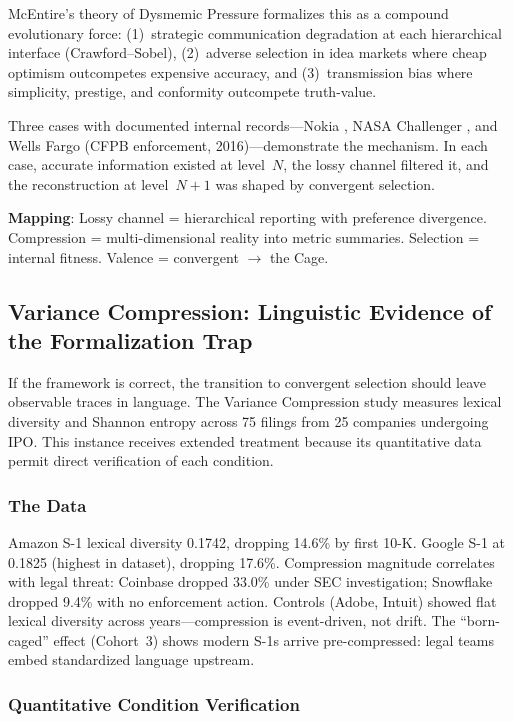 \documentclass[12pt,letterpaper]{article}
\theoremstyle{definition}
\theoremstyle{remark}
\begin{document}
McEntire's theory of Dysmemic Pressure formalizes this as a compound evolutionary force: (1)~strategic communication degradation at each hierarchical interface (Crawford--Sobel), (2)~adverse selection in idea markets where cheap optimism outcompetes expensive accuracy, and (3)~transmission bias where simplicity, prestige, and conformity outcompete truth-value.

Three cases with documented internal records---Nokia \citep{vuori2016}, NASA Challenger \citep{vaughan1996}, and Wells Fargo (CFPB enforcement, 2016)---demonstrate the mechanism. In each case, accurate information existed at level~$N$, the lossy channel filtered it, and the reconstruction at level~$N{+}1$ was shaped by convergent selection.

\textbf{Mapping}: Lossy channel = hierarchical reporting with preference divergence. Compression = multi-dimensional reality into metric summaries. Selection = internal fitness. Valence = convergent $\to$ the Cage.


\subsection{Variance Compression: Linguistic Evidence of the Formalization Trap}

If the framework is correct, the transition to convergent selection should leave observable traces in language. The Variance Compression study measures lexical diversity and Shannon entropy across 75 filings from 25 companies undergoing IPO\@. This instance receives extended treatment because its quantitative data permit direct verification of each condition.

\subsubsection{The Data}

Amazon S-1 lexical diversity 0.1742, dropping 14.6\% by first 10-K\@. Google S-1 at 0.1825 (highest in dataset), dropping 17.6\%. Compression magnitude correlates with legal threat: Coinbase dropped 33.0\% under SEC investigation; Snowflake dropped 9.4\% with no enforcement action. Controls (Adobe, Intuit) showed flat lexical diversity across years---compression is event-driven, not drift. The ``born-caged'' effect (Cohort~3) shows modern S-1s arrive pre-compressed: legal teams embed standardized language upstream.

\subsubsection{Quantitative Condition Verification}
\end{document}
